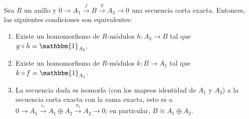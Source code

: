 \documentclass[12pt]{report}
\newcounter{it}
\theoremstyle{largebreak}
\newcommand\cf[3]{\ensuremath{#1:#2\rightarrow#3}}
\newcommand{\bbm}[1]{\mathbbm{#1}}
\begin{document}
    \begin{theor}
        Sea $R$ un anillo y $0\rightarrow A_1\overset{f}{\rightarrow}B\overset{g}{\rightarrow}A_2\rightarrow0$ una secuencia corta exacta. Entonces, las siguientes condiciones son equivalentes:
        \begin{enumerate}[label = \textit{(\arabic*)}]
            \item Existe un homomorfismo de $R$-módulos $\cf{h}{A_2}{B}$ tal que $g\circ h=\bbm{1}_{ A_2}$.
            \item Existe un homomorfismo de $R$-módulos $\cf{k}{B}{A_1}$ tal que $k\circ f=\bbm{1}_{ A_1}$.
            \item La secuencia dada es isomorfa (con los mapeos identidad de $A_1$ y $A_2$) a la secuencia corta exacta con la suma exacta, esto es a $0\rightarrow A_1\overset{\iota_1}{\rightarrow}A_1\oplus A_2 \overset{\pi_2}{\rightarrow}A_2\rightarrow0$; en particular, $B\cong A_1\oplus A_2$.
        \end{enumerate}
    \end{theor}
\end{document}
